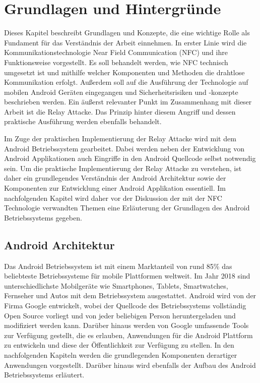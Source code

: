 \chapter{Grundlagen und Hintergründe}
\label{sec:fundamentals}

Dieses Kapitel beschreibt Grundlagen und Konzepte, die eine wichtige Rolle als Fundament für das Verständnis der Arbeit einnehmen. In erster Linie wird die Kommunikationstechnologie Near Field Communication (NFC) und ihre Funktionsweise vorgestellt. Es soll behandelt werden, wie NFC technisch umgesetzt ist und mithilfe welcher Komponenten und Methoden die drahtlose Kommunikation erfolgt. Außerdem soll auf die Ausführung der Technologie auf mobilen Android Geräten eingegangen und Sicherheitsrisiken und -konzepte beschrieben werden. Ein äußerst relevanter Punkt im Zusammenhang mit dieser Arbeit ist die Relay Attacke. Das Prinzip hinter diesem Angriff und dessen praktische Ausführung werden ebenfalls behandelt. 

Im Zuge der praktischen Implementierung der Relay Attacke wird mit dem Android Betriebssystem gearbeitet. Dabei werden neben der Entwicklung von Android Applikationen auch Eingriffe in den Android Quellcode selbst notwendig sein. Um die praktische Implementierung der Relay Attacke zu verstehen, ist daher ein grundlegendes Verständnis der Android Architektur sowie der Komponenten zur Entwicklung einer Android Applikation essentiell. Im nachfolgenden Kapitel wird daher vor der Diskussion der mit der NFC Technologie verwandten Themen eine Erläuterung der Grundlagen des Android Betriebssystems gegeben. 

\section{Android Architektur}

Das Android Betriebssystem ist mit einem Marktanteil von rund 85\% \cite{android-marketshare} das beliebteste Betriebssysteme für mobile Plattformen weltweit. Im Jahr 2018 sind unterschiedlichste Mobilgeräte wie Smartphones, Tablets, Smartwatches, Fernseher und Autos mit dem Betriebssystem ausgestattet. Android wird von der Firma Google entwickelt, wobei der Quellcode des Betriebssystems vollständig Open Source vorliegt und von jeder beliebigen Person heruntergeladen und modifiziert werden kann. Darüber hinaus werden von Google umfassende Tools zur Verfügung gestellt, die es erlauben, Anwendungen für die Android Plattform zu entwickeln und diese der Öffentlichkeit zur Verfügung zu stellen. In den nachfolgenden Kapiteln werden die grundlegenden Komponenten derartiger Anwendungen vorgestellt. Darüber hinaus wird ebenfalls der Aufbau des Android Betriebssystems erläutert. 

